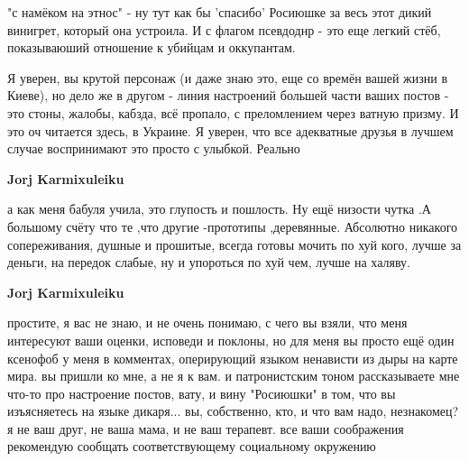 \begin{itemize}
\begin{itemize}
"с намёком на этнос" - ну тут как бы 'спасибо' Росиюшке за весь этот дикий
винигрет, который она устроила. И с флагом псевдоднр - это еще легкий стёб,
показываюший отношение к убийцам и оккупантам.

Я уверен, вы крутой персонаж (и даже знаю это, еще со времён вашей жизни в
Киеве), но дело же в другом - линия настроений большей части ваших постов - это
стоны, жалобы, кабзда, всё пропало, с преломлением через ватную призму. И это
оч читается здесь, в Украине. Я уверен, что все адекватные друзья в лучшем
случае воспринимают это просто с улыбкой. Реально



 
\textbf{Jorj Karmixuleiku} 

а как меня бабуля учила, это глупость и пошлость. Ну
ещё низости чутка .А большому счёту что те ,что другие -прототипы
,деревянные. Абсолютно никакого сопереживания, душные и прошитые, всегда готовы
мочить по хуй кого, лучше за деньги, на передок слабые, ну и упороться по хуй
чем, лучше на халяву.

 
\textbf{Jorj Karmixuleiku} 

простите, я вас не знаю, и не очень понимаю, с чего
вы взяли, что меня интересуют ваши оценки, исповеди и поклоны, но для меня вы
просто ещё один ксенофоб у меня в комментах, оперирующий языком ненависти из
дыры на карте мира. вы пришли ко мне, а не я к вам. и патронистским тоном
рассказываете мне что-то про настроение постов, вату, и вину "Росиюшки" в том,
что вы изъясняетесь на языке дикаря... вы, собственно, кто, и что вам надо,
незнакомец? я не ваш друг, не ваша мама, и не ваш терапевт. все ваши
соображения рекомендую сообщать соответствующему социальному окружению


 

\end{itemize}
\end{itemize}
